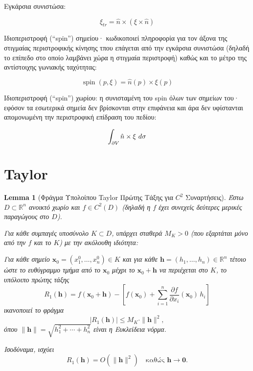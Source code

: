 \documentclass[10pt,a4paper,twoside,openany]{book}
\theoremstyle{plain}
\newtheorem{lemma}[theorem]{Lemma}
\theoremstyle{definition}
\theoremstyle{remark}
\numberwithin{equation}{section}
\begin{document}
\noindent
Εγκάρσια συνιστώσα:

\begin{equation}
\xi_{tr} = \hat{n} \times (\xi \times \hat{n})
\end{equation}

\noindent
Iδιοπεριστροφή (``spin'') σημείου· κωδικοποιεί πληροφορία για τον άξονα
της στιγμαίας περιστροφικής κίνησης τπου επάγεται από την εγκάρσια
συνιστώσα (δηλαδή το επίπεδο στο οποίο λαμβάνει χώρα η στιγμαία περιστροφή)
καθώς και το μέτρο της αντίστοιχης γωνιακής ταχύτητας:

\begin{equation}
\operatorname{spin}(p, \xi) = \hat{n}(p) \times \xi(p)
\end{equation}

\noindent
Ιδιοπεριστροφή (``spin'') χωρίου: η συνισταμένη του spin όλων των σημείων του·
εφόσον τα εσωτερικά σημεία δεν βρίσκονται στην επιφάνεια και άρα δεν υφίστανται
απομονωμένη την περιστροφική επίδραση του πεδίου:

\begin{equation}
\int_{\partial V} \hspace{-0.5pt} \hat{n} \times \xi \,\, d\sigma
\end{equation}


\section{Taylor}

\begin{lemma}[Φράγμα Υπολοίπου Taylor Πρώτης Τάξης για \(C^2\) Συναρτήσεις]
\label{lem:C2_Taylor_bound_Rn}
Έστω \(D \subset \mathbb{R}^n\) ανοικτό χωρίο και \(f \in C^2(D)\) (δηλαδή η \(f\) έχει συνεχείς δεύτερες μερικές παραγώγους στο \(D\)). 

Για κάθε συμπαγές υποσύνολο \(K \subset D\), υπάρχει σταθερά \(M_K > 0\) (που εξαρτάται μόνο από την \(f\) και το \(K\)) με την ακόλουθη ιδιότητα:

Για κάθε σημείο \(\mathbf{x}_0 = (x_1^0, \dots, x_n^0) \in K\) και για κάθε \(\mathbf{h} = (h_1, \dots, h_n) \in \mathbb{R}^n\) τέτοιο ώστε το ευθύγραμμο τμήμα από το \(\mathbf{x}_0\) μέχρι το \(\mathbf{x}_0 + \mathbf{h}\) να περιέχεται στο \(K\), το υπόλοιπο πρώτης τάξης
\[
R_1(\mathbf{h}) = f(\mathbf{x}_0 + \mathbf{h}) - \left[ f(\mathbf{x}_0) + \sum_{i=1}^n \frac{\partial f}{\partial x_i}(\mathbf{x}_0) \, h_i \right]
\]
ικανοποιεί το φράγμα
\[
|R_1(\mathbf{h})| \le M_K \cdot \|\mathbf{h}\|^2,
\]
όπου \(\|\mathbf{h}\| = \sqrt{h_1^2 + \cdots + h_n^2}\) είναι η Ευκλείδεια νόρμα.

Ισοδύναμα, ισχύει
\[
R_1(\mathbf{h}) = O(\|\mathbf{h}\|^2) \quad \text{καθώς } \mathbf{h} \to \mathbf{0}.
\]
\end{lemma}
\end{document}

